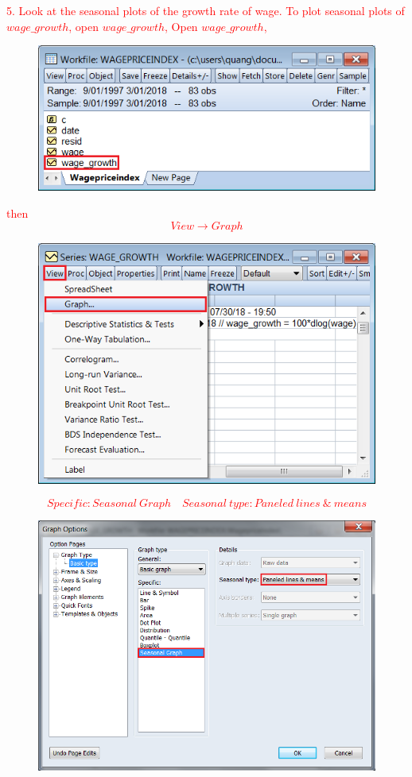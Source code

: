 \documentclass[12pt]{report}
\begin{document}
\noindent \textcolor{red}{5. Look at the seasonal plots of the growth rate of wage. To plot seasonal plots of $wage\_growth$, open $wage\_growth$, \noindent Open $wage\_growth$, \begin{figure}[H]
		\centerline{\includegraphics{2018sem2_q2_8}}
	\end{figure}
	\vspace{-\baselineskip} then $$View \to Graph$$ \begin{figure}[H]
		\centerline{\includegraphics{2018sem2_q2_11}}
	\end{figure}
	\vspace{-\baselineskip} $$Specific: Seasonal\ Graph \quad Seasonal\ type: Paneled\ lines\ \&\ means$$\begin{figure}[H]
		\centerline{\includegraphics{2018sem2_q2_12}}
	\end{figure}
	\vspace{-\baselineskip}}
\end{document}
